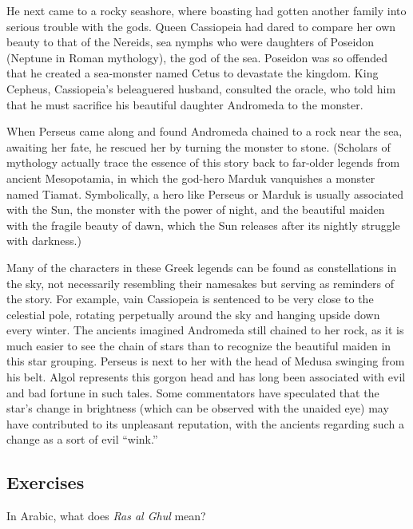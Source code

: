 \documentclass{article}
\numberwithin{equation}{section}
\numberwithin{figure}{section}
\begin{document}
\begin{mdframed}[backgroundcolor=black!5]
He next came to a rocky seashore, where boasting had gotten another family into serious trouble with the gods. Queen Cassiopeia had dared to compare her own beauty to that of the Nereids, sea nymphs who were daughters of Poseidon (Neptune in Roman mythology), the god of the sea. Poseidon was so offended that he created a sea-monster named Cetus to devastate the kingdom. King Cepheus, Cassiopeia's beleaguered husband, consulted the oracle, who told him that he must sacrifice his beautiful daughter Andromeda to the monster.
\vspace{1em}

When Perseus came along and found Andromeda chained to a rock near the sea, awaiting her fate, he rescued her by turning the monster to stone. (Scholars of mythology actually trace the essence of this story back to far-older legends from ancient Mesopotamia, in which the god-hero Marduk vanquishes a monster named Tiamat. Symbolically, a hero like Perseus or Marduk is usually associated with the Sun, the monster with the power of night, and the beautiful maiden with the fragile beauty of dawn, which the Sun releases after its nightly struggle with darkness.)
\vspace{1em}

Many of the characters in these Greek legends can be found as constellations in the sky, not necessarily resembling their namesakes but serving as reminders of the story. For example, vain Cassiopeia is sentenced to be very close to the celestial pole, rotating perpetually around the sky and hanging upside down every winter. The ancients imagined Andromeda still chained to her rock, as it is much easier to see the chain of stars than to recognize the beautiful maiden in this star grouping. Perseus is next to her with the head of Medusa swinging from his belt. Algol represents this gorgon head and has long been associated with evil and bad fortune in such tales. Some commentators have speculated that the star's change in brightness (which can be observed with the unaided eye) may have contributed to its unpleasant reputation, with the ancients regarding such a change as a sort of evil ``wink.''
\end{mdframed}

\subsection*{Exercises}



\begin{exercise} \label{PfKIgU}
    In Arabic, what does \textit{Ras al Ghul} mean?
\end{exercise}
\end{document}
